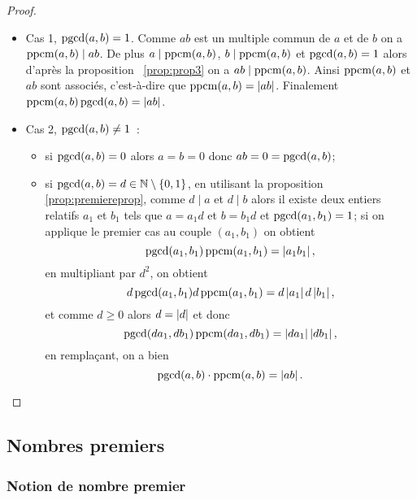 \begin{proof}
  \begin{itemize}
    \item Cas 1, \(\operatorname{pgcd}(a,b)=1\). Comme \(ab\) est un multiple commun de \(a\) et de \(b\) on a \(\operatorname{ppcm}(a,b) \mid ab\). De plus \(a \mid \operatorname{ppcm}(a,b)\), \(b \mid \operatorname{ppcm}(a,b)\) et \(\operatorname{pgcd}(a,b)=1\) alors d'après la proposition~
      \ref{prop:prop3} on a \(ab \mid \operatorname{ppcm}(a,b)\). Ainsi \(\operatorname{ppcm}(a,b)\) et \(ab\) sont associés, c'est-à-dire que \(\operatorname{ppcm}(a,b)=\left\lvert ab\right\rvert\). Finalement  \(\operatorname{ppcm}(a,b)\operatorname{pgcd}(a,b)=\left\lvert ab\right\rvert\).
    \item Cas 2, \(\operatorname{pgcd}(a,b) \neq 1\)~:
      \begin{itemize}
        \item si \(\operatorname{pgcd}(a,b) = 0\) alors \(a=b=0\) donc \(ab=0=\operatorname{pgcd}(a,b)\);
        \item si \(\operatorname{pgcd}(a,b)=d \in \mathbb{N}\setminus\{0,1\}\), en utilisant la proposition~
          \ref{prop:premiereprop}, comme \(d  \mid a\) et \(d \mid b\) alors il existe deux entiers relatifs \(a_1\) et \(b_1\) tels que \(a=a_1 d\) et \(b=b_1d\) et \(\operatorname{pgcd}(a_1,b_1)=1\); si on applique le premier cas au couple \((a_1,b_1)\) on obtient
          \begin{equation}
            \operatorname{pgcd}(a_1,b_1) \operatorname{ppcm}(a_1,b_1) = \left\lvert a_1b_1\right\rvert,
          \end{equation}
          en multipliant par \(d^2\), on obtient
          \begin{equation}
            d\operatorname{pgcd}(a_1,b_1) d\operatorname{ppcm}(a_1,b_1) = d\left\lvert a_1\right\rvert d\left\lvert b_1\right\rvert,
          \end{equation}
          et comme \(d\geqslant 0\) alors \(d=\left\lvert d\right\rvert\) et donc    
          \begin{equation}
            \operatorname{pgcd}(da_1,db_1) \operatorname{ppcm}(da_1,db_1) = \left\lvert da_1\right\rvert \left\lvert db_1\right\rvert,
          \end{equation}
          en remplaçant, on a bien
          \begin{equation}
            \operatorname{pgcd}(a,b) \cdot \operatorname{ppcm}(a,b)= \left\lvert ab\right\rvert.
          \end{equation}
      \end{itemize}
  \end{itemize}
\end{proof}

\subsection{Nombres premiers}

\subsubsection{Notion de nombre premier}

